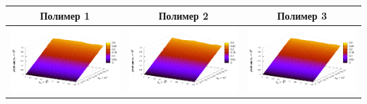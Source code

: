 \documentclass[12pt,a4paper]{article}
\theoremstyle{definition}
\begin{document}
\begin{table}[h]
  \centering
  \begin{tabular}{c c c}
	Полимер 1 & Полимер 2 & Полимер 3 \\ \hline
	\includegraphics[scale=0.4]{figs/even/p1.txt_coeff0.dat.pdf} & \includegraphics[scale=0.4]{figs/even/p2.txt_coeff0.dat.pdf} & \includegraphics[scale=0.4]{figs/even/p3.txt_coeff0.dat.pdf} \\

\end{tabular}
\end{table}
\end{document}
